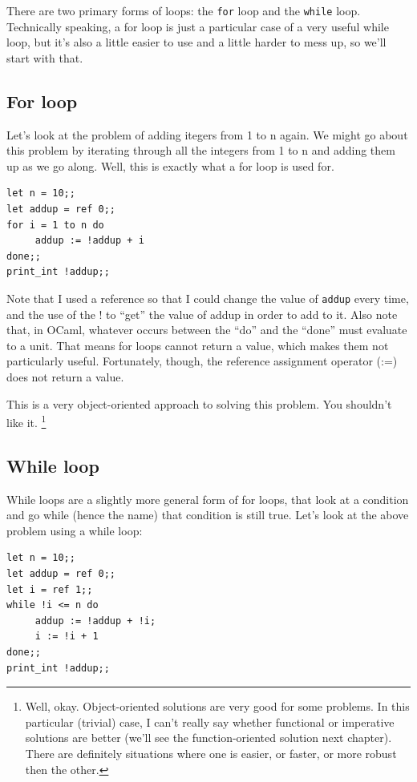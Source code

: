 \documentclass[10pt]{book}
\begin{document}
{

There are two primary forms of loops: the {\tt for} loop and the {\tt while}
loop. Technically speaking, a for loop is just a particular case of a very useful
while loop, but it's also a little easier to use and a little harder to mess up, so
we'll start with that.

\subsection{For loop}

Let's look at the problem of adding itegers from 1 to n again. 
We might go about this problem by iterating through all the integers from 1 to n and 
adding them up as we go along. Well, this is exactly what a for loop is used for.

\beforeverb
\begin{verbatim}
let n = 10;;
let addup = ref 0;;
for i = 1 to n do
     addup := !addup + i
done;;
print_int !addup;;
\end{verbatim}
\afterverb

Note that I used a reference so that I could change the value of {\tt addup} every time, 
and the use of the ! to ``get'' the value of addup in order to add to it. Also note that, 
in OCaml, whatever occurs between the ``do'' and the ``done'' must evaluate to a unit. 
That means for loops cannot return a value, which makes them not particularly useful. 
Fortunately, though, the reference assignment operator (:=) does not return a value.

This is a very object-oriented approach to solving this problem. You shouldn't like it.
\footnote{Well, okay. Object-oriented solutions are very good for some problems. In this 
particular (trivial) case, I can't really say whether functional or imperative solutions 
are better (we'll see the function-oriented solution next chapter). There are definitely 
situations where one is easier, or faster, or more robust then the other.}

\subsection{While loop}

While loops are a slightly more general form of for loops, that look at a condition and
go while (hence the name) that condition is still true. Let's look at the above problem
using a while loop:

\beforeverb
\begin{verbatim}
let n = 10;;
let addup = ref 0;;
let i = ref 1;;
while !i <= n do
     addup := !addup + !i;
     i := !i + 1
done;;
print_int !addup;;
\end{verbatim}
\afterverb

}
\end{document}
